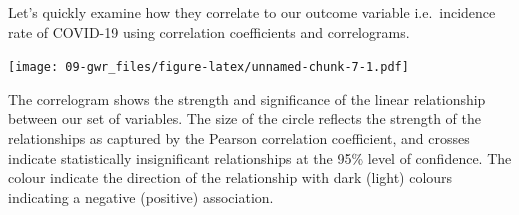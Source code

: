 \documentclass[
]{book}
\newenvironment{Shaded}{\begin{snugshade}}{\end{snugshade}}
\newcommand{\AttributeTok}[1]{\textcolor[rgb]{0.77,0.63,0.00}{#1}}
\newcommand{\CommentTok}[1]{\textcolor[rgb]{0.56,0.35,0.01}{\textit{#1}}}
\newcommand{\ConstantTok}[1]{\textcolor[rgb]{0.00,0.00,0.00}{#1}}
\newcommand{\DecValTok}[1]{\textcolor[rgb]{0.00,0.00,0.81}{#1}}
\newcommand{\FloatTok}[1]{\textcolor[rgb]{0.00,0.00,0.81}{#1}}
\newcommand{\FunctionTok}[1]{\textcolor[rgb]{0.00,0.00,0.00}{#1}}
\newcommand{\NormalTok}[1]{#1}
\newcommand{\OtherTok}[1]{\textcolor[rgb]{0.56,0.35,0.01}{#1}}
\newcommand{\SpecialCharTok}[1]{\textcolor[rgb]{0.00,0.00,0.00}{#1}}
\newcommand{\StringTok}[1]{\textcolor[rgb]{0.31,0.60,0.02}{#1}}
\begin{document}
Let's quickly examine how they correlate to our outcome variable i.e.~incidence rate of COVID-19 using correlation coefficients and correlograms.

\begin{Shaded}
\end{Shaded}

\texttt{[image: 09-gwr\_files/figure-latex/unnamed-chunk-7-1.pdf]}

The correlogram shows the strength and significance of the linear relationship between our set of variables. The size of the circle reflects the strength of the relationships as captured by the Pearson correlation coefficient, and crosses indicate statistically insignificant relationships at the 95\% level of confidence. The colour indicate the direction of the relationship with dark (light) colours indicating a negative (positive) association.
\end{document}
